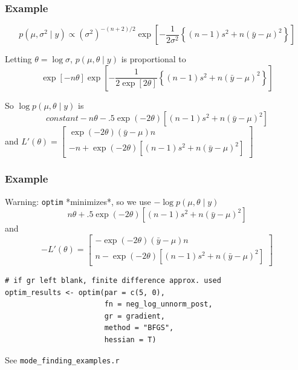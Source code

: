 \documentclass{beamer}
\begin{document}
\begin{frame}[fragile]
\frametitle{Example}

\[
p(\mu, \sigma^2 \mid y) \propto (\sigma^2)^{-(n+2)/2}\exp\left[ - \frac{1}{2\sigma^2}\left\{(n-1)  s^2 + n(\bar{y} - \mu)^2 \right\} \right]
\]

Letting $\theta = \log \sigma$, $p(\mu, \theta \mid y)$ is proportional to
\[
\exp[-n\theta]\exp\left[ - \frac{1}{2\exp[2\theta]}\left\{(n-1)  s^2 + n(\bar{y} - \mu)^2 \right\} \right] 
\]

So $\log p(\mu, \theta \mid y)$ is 
$$
constant -n\theta - .5\exp(-2\theta)\left[(n-1)  s^2 + n(\bar{y} - \mu)^2 \right]
$$
and $L'(\theta) = \left[\begin{array}{c}
\exp(-2\theta)(\bar{y}-\mu)n \\ -n + \exp(-2\theta)\left[(n-1)  s^2 + n(\bar{y} - \mu)^2 \right]
\end{array}\right]$

\end{frame}

\begin{frame}[fragile]
\frametitle{Example}

Warning: \verb|optim| *minimizes*, so we use $-\log p(\mu, \theta \mid y)$ 
$$
n\theta + .5\exp(-2\theta)\left[(n-1)  s^2 + n(\bar{y} - \mu)^2 \right]
$$
and 
$$
-L'(\theta) = \left[\begin{array}{c}
-\exp(-2\theta)(\bar{y}-\mu)n \\ 
n - \exp(-2\theta)\left[(n-1)  s^2 + n(\bar{y} - \mu)^2 \right]
\end{array}\right]
$$

\begin{verbatim}
# if gr left blank, finite difference approx. used
optim_results <- optim(par = c(5, 0), 
                       fn = neg_log_unnorm_post, 
                       gr = gradient, 
                       method = "BFGS", 
                       hessian = T)
\end{verbatim}
See \verb|mode_finding_examples.r|

\end{frame}
\end{document}
